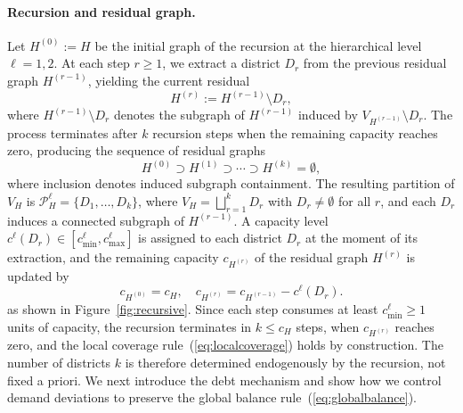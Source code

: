 \documentclass[11pt]{article}
\theoremstyle{definition}
\begin{document}
\paragraph{Recursion and residual graph.} Let $H^{(0)} := H$ be the initial graph of the recursion at the hierarchical level $\ell=1,2$. At each step $r \geq 1$, we extract a district $D_r$ from the previous residual graph $H^{(r-1)}$, yielding the current residual
%
\[
    H^{(r)} := H^{(r-1)} \setminus D_{r},
\]
%
where $H^{(r-1)} \setminus D_r$ denotes the subgraph of $H^{(r-1)}$ induced by $V_{H^{(r-1)}} \setminus D_r$. The process terminates after $k$ recursion steps when the remaining capacity reaches zero, producing the sequence of residual graphs
%
\[
    H^{(0)} \supset H^{(1)} \supset \cdots \supset H^{(k)}  = \emptyset,
\]
%
where inclusion denotes induced subgraph containment. The resulting partition of $V_H$ is $\mathcal{P}^{\ell}_H = \{D_1, \ldots, D_k\}$, where $V_H = \bigsqcup_{r=1}^{k} D_r$ with $D_r \neq \emptyset$ for all $r$, and each $D_r$ induces a connected subgraph of $H^{(r-1)}$. A capacity level $c^{\ell}(D_r) \in [c_{\min}^{\ell}, c_{\max}^{\ell}]$ is assigned to each district $D_r$ at the moment of its extraction, and the remaining capacity $c_{H^{(r)}}$ of the residual graph $H^{(r)}$ is updated by 
%
\begin{equation}\label{eq:capacityupdate}
    c_{H^{(0)}} = c_H, \quad c_{H^{(r)}} = c_{H^{(r-1)}} - c^\ell(D_r).
\end{equation}
%
as shown in Figure~\ref{fig:recursive}. Since each step consumes at least $c_{\min}^\ell \geq 1$ units of capacity, the recursion terminates in $k \leq c_H$ steps, when $c_{H^{(r)}}$ reaches zero, and the local coverage rule~(\ref{eq:localcoverage}) holds by construction. The number of districts $k$ is therefore determined endogenously by the recursion, not fixed a priori. We next introduce the debt mechanism and show how we control demand deviations to preserve the global balance rule~(\ref{eq:globalbalance}).



\end{document}
